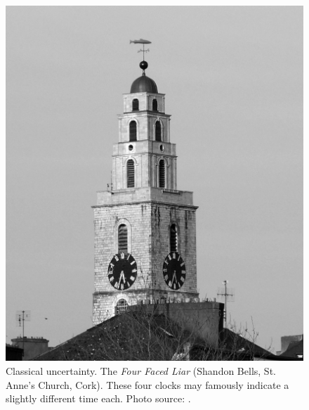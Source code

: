 \begin{figure}[h]
  \centering
  \includegraphics[height=.5\textheight]{img/Shandon_bells_cork.BW.jpg}
  \caption[
    The \emph{Four Faced Liar} -- Shandon Bells, Cork
  ]{
    Classical uncertainty.
    The \emph{Four Faced Liar}
    (Shandon Bells, St. Anne's Church, Cork).
    These four clocks
    may
    famously
    indicate a slightly different time each.
    Photo source: \cite{ShandonBells}.
  }
  \vspace{3\baselineskip}
  \label{fig:ShandonBells}
\end{figure}
